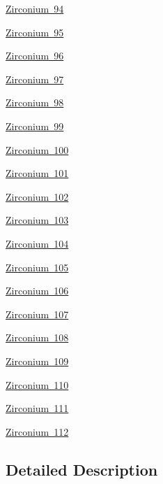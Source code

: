 \begin{DoxyCompactItemize}
\mbox{\hyperlink{group___isotope_const-_zirconium-_zr94}{Zirconium 94}}
\item 
\mbox{\hyperlink{group___isotope_const-_zirconium-_zr95}{Zirconium 95}}
\item 
\mbox{\hyperlink{group___isotope_const-_zirconium-_zr96}{Zirconium 96}}
\item 
\mbox{\hyperlink{group___isotope_const-_zirconium-_zr97}{Zirconium 97}}
\item 
\mbox{\hyperlink{group___isotope_const-_zirconium-_zr98}{Zirconium 98}}
\item 
\mbox{\hyperlink{group___isotope_const-_zirconium-_zr99}{Zirconium 99}}
\item 
\mbox{\hyperlink{group___isotope_const-_zirconium-_zr100}{Zirconium 100}}
\item 
\mbox{\hyperlink{group___isotope_const-_zirconium-_zr101}{Zirconium 101}}
\item 
\mbox{\hyperlink{group___isotope_const-_zirconium-_zr102}{Zirconium 102}}
\item 
\mbox{\hyperlink{group___isotope_const-_zirconium-_zr103}{Zirconium 103}}
\item 
\mbox{\hyperlink{group___isotope_const-_zirconium-_zr104}{Zirconium 104}}
\item 
\mbox{\hyperlink{group___isotope_const-_zirconium-_zr105}{Zirconium 105}}
\item 
\mbox{\hyperlink{group___isotope_const-_zirconium-_zr106}{Zirconium 106}}
\item 
\mbox{\hyperlink{group___isotope_const-_zirconium-_zr107}{Zirconium 107}}
\item 
\mbox{\hyperlink{group___isotope_const-_zirconium-_zr108}{Zirconium 108}}
\item 
\mbox{\hyperlink{group___isotope_const-_zirconium-_zr109}{Zirconium 109}}
\item 
\mbox{\hyperlink{group___isotope_const-_zirconium-_zr110}{Zirconium 110}}
\item 
\mbox{\hyperlink{group___isotope_const-_zirconium-_zr111}{Zirconium 111}}
\item 
\mbox{\hyperlink{group___isotope_const-_zirconium-_zr112}{Zirconium 112}}
\end{DoxyCompactItemize}


\subsection{Detailed Description}
